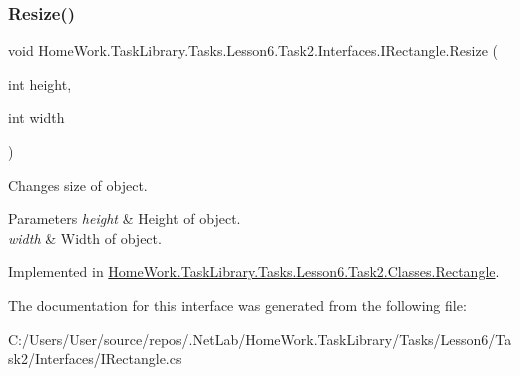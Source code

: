 \subsubsection{\texorpdfstring{Resize()}{Resize()}}
{\footnotesize\ttfamily void Home\+Work.\+Task\+Library.\+Tasks.\+Lesson6.\+Task2.\+Interfaces.\+I\+Rectangle.\+Resize (\begin{DoxyParamCaption}\item[{int}]{height,  }\item[{int}]{width }\end{DoxyParamCaption})}



Changes size of object. 


\begin{DoxyParams}{Parameters}
{\em height} & Height of object.\\
\hline
{\em width} & Width of object.\\
\hline
\end{DoxyParams}


Implemented in \mbox{\hyperlink{class_home_work_1_1_task_library_1_1_tasks_1_1_lesson6_1_1_task2_1_1_classes_1_1_rectangle_a6f52dae1798b1343f1d95d4e64d4417f}{Home\+Work.\+Task\+Library.\+Tasks.\+Lesson6.\+Task2.\+Classes.\+Rectangle}}.



The documentation for this interface was generated from the following file\+:\begin{DoxyCompactItemize}
\item 
C\+:/\+Users/\+User/source/repos/.\+Net\+Lab/\+Home\+Work.\+Task\+Library/\+Tasks/\+Lesson6/\+Task2/\+Interfaces/I\+Rectangle.\+cs\end{DoxyCompactItemize}
